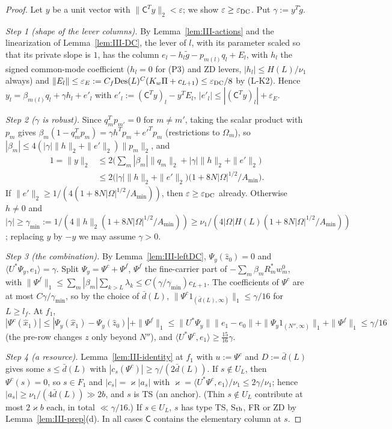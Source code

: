 \documentclass[10pt]{amsart}
\theoremstyle{definition}
\theoremstyle{remark}
\newcommand{\zh}{\hat z}
\newcommand{\ip}[2]{\langle #1,#2\rangle}
\begin{document}
\begin{proof}
Let $y$ be a unit vector with $\|\mathsf C^Ty\|_2<\varepsilon$; we show
$\varepsilon\ge\varepsilon_{\rm DC}$.  Put $\gamma:=y^T\tilde g$.

\emph{Step 1 (shape of the lever columns).}  By Lemma~\ref{lem:III-actions}
and the linearization of Lemma~\ref{lem:III-DC}, the lever of $l$, with its
parameter scaled so that its private slope is $1$, has the column
$e_l-h_l\tilde g-p_{m(l)}q_l+E_l$, with $h_l$ the signed common-mode coefficient ($h_l=0$ for (P3) and
ZD levers, $|h_l|\le H(L)/\nu_1$ always) and $\|E_l\|\le\varepsilon_E:=C_f
\mathrm{Des}(L)^C(K_w\Pi+c_{L+1})\le\varepsilon_{\rm DC}/8$ by (L-K2).  Hence
$y_l=\beta_{m(l)}q_l+\gamma h_l+e'_l$ with $e'_l:=(\mathsf C^Ty)_l-y^TE_l$,
$|e'_l|\le|(\mathsf C^Ty)_l|+\varepsilon_E$.

\emph{Step 2 ($\gamma$ is robust).}  Since $q_m^Tp_{m'}=0$ for $m\ne m'$, taking
the scalar product with $p_m$ gives $\beta_m(1-q_m^Tp_m)=\gamma h^Tp_m+e'^Tp_m$
(restrictions to $\Omega_m$), so $|\beta_m|\le4(|\gamma|\|h\|_2+\|e'\|_2)\|p_m\|_2$, and
\begin{align*}
 1=\|y\|_2&\le2\Big(\sum_m|\beta_m|\|q_m\|_2+|\gamma|\|h\|_2+\|e'\|_2\Big)\\
 &\le2\big(|\gamma|\|h\|_2+\|e'\|_2\big)\big(1+8N|\Omega|^{1/2}/A_{\min}\big).
\end{align*}
If $\|e'\|_2\ge1/(4(1+8N|\Omega|^{1/2}/A_{\min}))$, then $\varepsilon\ge
\varepsilon_{\rm DC}$ already.  Otherwise $h\ne0$ and $|\gamma|\ge\gamma_{\min}:=
1/(4\|h\|_2(1+8N|\Omega|^{1/2}/A_{\min}))\ge\nu_1/(4|\Omega|H(L)(1+8N|\Omega|^{1/2}
/A_{\min}))$; replacing $y$ by $-y$ we may assume $\gamma>0$.

\emph{Step 3 (the combination).}  By Lemma~\ref{lem:III-leftDC}, $\Psi_y(\zh_0)=0$
and $\ip{U^*\Psi_y}{e_1}=\gamma$.  Split $\Psi_y=\Psi^c+\Psi^f$, $\Psi^f$ the
fine-carrier part of $-\sum_m\beta_mR_m^*w^0_m$, with $\|\Psi^f\|_1\le
\sum_m|\beta_m|\sum_{k>L}\lambda_k\le C(\gamma/\gamma_{\min})c_{L+1}$.  The
coefficients of $\Psi^c$ are at most $C\gamma/\gamma_{\min}$, so by the choice
of $\bar d(L)$, $\|\Psi^c1_{(\bar d(L),\infty)}\|_1\le\gamma/16$ for $L\ge l_f$.
At $f_1$, $|\Psi^c(\hat x_1)|\le|\Psi_y(\hat x_1)-\Psi_y(\zh_0)|+\|\Psi^f\|_1\le
\|U^*\Psi_y\|\|e_1-e_0\|+\|\Psi_y1_{(N'',\infty)}\|_1+\|\Psi^f\|_1\le\gamma/16$
(the pre-row changes $z$ only beyond $N''$), and $\ip{U^*\Psi^c}{e_1}\ge
\frac{15}{16}\gamma$.

\emph{Step 4 (a resource).}  Lemma~\ref{lem:III-identity} at $f_1$ with
$u:=\Psi^c$ and $D:=\bar d(L)$ gives some $s\le\bar d(L)$ with
$|c_s(\Psi^c)|\ge\gamma/(2\bar d(L))$.  If $s\notin U_L$, then $\Psi^c(s)=0$, so
$s\in F_1$ and $|c_s|=\varkappa|a_s|$ with $\varkappa=\ip{U^*\Psi^c}{e_1}/\nu_1
\le2\gamma/\nu_1$; hence $|a_s|\ge\nu_1/(4\bar d(L))\gg2b$, and $s$ is TS (an
anchor).  (Thin $s\notin U_L$ contribute at most $2\varkappa b$ each, in total
$\ll\gamma/16$.)  If $s\in U_L$, $s$ has type TS, S$_{\rm th}$, FR or ZD by
Lemma~\ref{lem:III-prep}(d).  In all cases $\mathsf C$ contains the elementary
column at $s$.


\end{proof}
\end{document}
